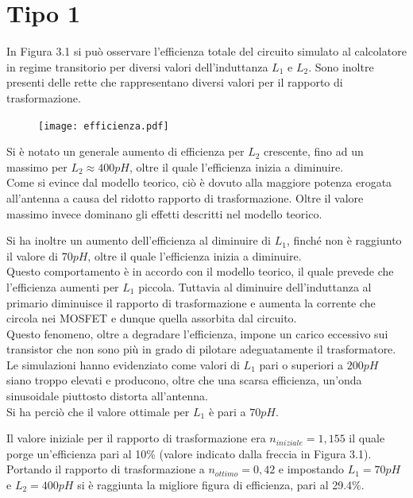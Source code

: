 \documentclass[a4paper, 12pt]{memoir}
\begin{document}
\section{Tipo 1}
In Figura 3.1 si può osservare l'efficienza totale del circuito simulato al
calcolatore in regime transitorio per diversi valori dell'induttanza $L_1$ e
$L_2$. Sono inoltre presenti delle rette che rappresentano diversi valori per 
il rapporto di trasformazione.

\begin{figure}[h!]
\centering
\texttt{[image: efficienza.pdf]}
\caption{}
\end{figure}

Si è notato un generale aumento di efficienza per $L_2$ crescente, fino ad un
massimo per $L_2 \approx 400pH$, oltre il quale l'efficienza inizia a
diminuire.\\
Come si evince dal modello teorico, ciò è dovuto alla maggiore potenza erogata
all'antenna a causa del ridotto rapporto di trasformazione. Oltre il valore
massimo invece dominano gli effetti descritti nel modello teorico.

Si ha inoltre un aumento dell'efficienza al diminuire di $L_1$, finché non è
raggiunto il valore di $70pH$, oltre il quale l'efficienza inizia a diminuire.
\\Questo comportamento è in accordo con il modello teorico, il quale prevede
che l'efficienza aumenti per $L_1$ piccola. Tuttavia al diminuire 
dell'induttanza al primario diminuisce il rapporto di trasformazione e aumenta
la corrente che circola nei MOSFET e dunque quella assorbita dal circuito.\\
Questo fenomeno, oltre a degradare l'efficienza, impone un carico eccessivo sui
transistor che non sono più in grado di pilotare adeguatamente il trasformatore.
Le simulazioni hanno evidenziato come valori di $L_1$ pari o superiori a $200pH$
siano troppo elevati e producono, oltre che una scarsa efficienza, un'onda
sinusoidale piuttosto distorta all'antenna.\\
Si ha perciò che il valore ottimale per $L_1$ è pari a $70pH$.

Il valore iniziale per il rapporto di trasformazione era $n_{iniziale}=1,155$
il quale porge un'efficienza pari al 10\% (valore indicato dalla freccia in
Figura 3.1).\\
Portando il rapporto di trasformazione a $n_{ottimo}=0,42$ e impostando
$L_1=70pH$ e $L_2=400pH$ si è raggiunta la migliore figura di efficienza, pari
al 29.4\%.
\end{document}
